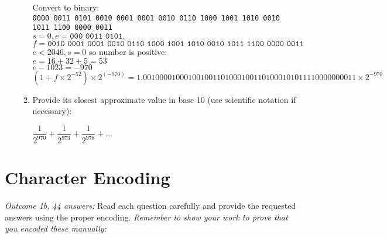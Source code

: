 \documentclass[11pt]{article}
\begin{document}
\begin{enumerate}
\begin{enumerate}
Convert to binary:\\

\texttt{0000 0011 0101 0010 0001 0001 0010 0110 1000 1001 1010 0010 1011 1100 0000 0011}\\

$s=0, e=\texttt{000 0011 0101},$\\
$f=\texttt{0010 0001 0001 0010 0110 1000 1001 1010 0010 1011 1100 0000 0011}$\\

$e < 2046, s = 0$ so number is positive:\\

$e = 16 + 32 + 5 = 53$\\
$e - 1023 = -970$\\

$(1 + f\times2^{-52})\times2^{(-970)}  = \boxed{1.00100001 00010010011010001001101000101011110000000011 \times 2^{-970}}$

 

\item Provide its closest approximate value in base 10 (use scientific notation if necessary):

$\boxed{\dfrac{1}{2^{970}} + \dfrac{1}{2^{973}} + \dfrac{1}{2^{978}} + \text{...}}$

\end{enumerate}

\end{enumerate}

\section{Character Encoding}

\emph{Outcome 1b, 44 answers:} Read each question carefully and provide the requested answers using the
proper encoding. \emph{Remember to show your work to prove that you encoded these manually:}
\end{document}
